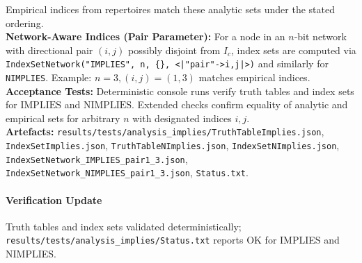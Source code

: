 \documentclass{article}
\begin{document}
Empirical indices from repertoires match these analytic sets under the stated ordering.\\
\textbf{Network-Aware Indices (Pair Parameter):} For a node in an \(n\)-bit network with directional pair \((i,j)\) possibly disjoint from \(I_c\), index sets are computed via \texttt{IndexSetNetwork("IMPLIES", n, \{\}, \texttt{<|"pair"->{i,j}|>})} and similarly for \texttt{NIMPLIES}. Example: \(n=3, (i,j)=(1,3)\) matches empirical indices.\\
\textbf{Acceptance Tests:} Deterministic console runs verify truth tables and index sets for \(\mathrm{IMPLIES}\) and \(\mathrm{NIMPLIES}\). Extended checks confirm equality of analytic and empirical sets for arbitrary \(n\) with designated indices \(i,j\).\\
\textbf{Artefacts:} \texttt{results/tests/analysis\_implies/TruthTableImplies.json}, \texttt{IndexSetImplies.json}, \texttt{TruthTableNImplies.json}, \texttt{IndexSetNImplies.json}, \texttt{IndexSetNetwork\_IMPLIES\_pair1\_3.json}, \texttt{IndexSetNetwork\_NIMPLIES\_pair1\_3.json}, \texttt{Status.txt}.
\paragraph{Verification Update} Truth tables and index sets validated deterministically; \texttt{results/tests/analysis\_implies/Status.txt} reports OK for IMPLIES and NIMPLIES.
\end{document}

